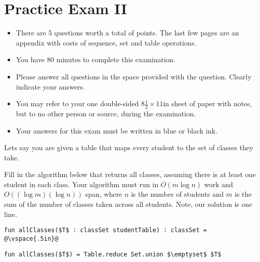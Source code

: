 \chapter{Practice Exam II}

\begin{preamble}
\newcommand{\numquestions}{5}

\begin{itemize}
\item There are \numquestions{} questions worth a total of \numpoints{} points.
  The last few pages are an appendix with costs of sequence,
  set and table operations.
\item You have 80 minutes to complete this examination.
\item Please answer all questions in the space provided with the
  question.  Clearly indicate your answers.
\item You may refer to your one double-sided $8\frac{1}{2} \times 11$in
  sheet of paper with notes, but to no other person or source, during the
  examination.

\item Your answers for this exam must be written in blue or black ink.

\end{itemize}
\end{preamble}

%



\begin{problem}[4p][Classes]



Lets say you are given a table that maps every student to the set of
classes they take. 

\freeresponse
Fill in the algorithm below that returns all classes,
assuming there is at least one student in each class.  Your algorithm
must run in $O(m \log n)$ work and $O((\log m)(\log n))$ span, where
$n$ is the number of students and $m$ is the sum of the number of
classes taken across all students.    Note, our solution is one line.


\vspace{.3in}
\begin{lstlisting}[numbers=none]
fun allClasses($T$ : classSet studentTable) : classSet = 
@\vspace{.5in}@
\end{lstlisting}

\sol
\begin{lstlisting}[numbers=none]
fun allClasses($T$) = Table.reduce Set.union $\emptyset$ $T$
\end{lstlisting}

\end{problem}


